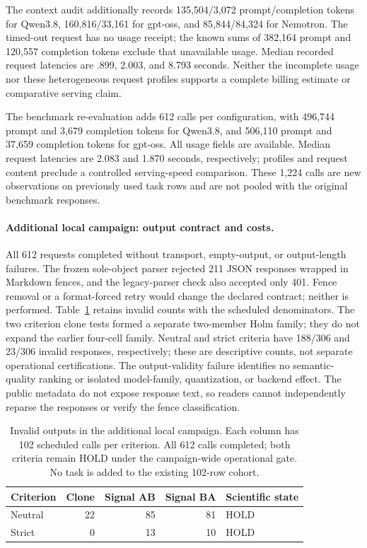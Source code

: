 \documentclass[10pt]{article}
\begin{document}
The context audit additionally records 135{,}504/3{,}072 prompt/completion tokens for Qwen3.8, 160{,}816/33{,}161 for gpt-oss, and 85{,}844/84{,}324 for Nemotron. The timed-out request has no usage receipt; the known sums of 382{,}164 prompt and 120{,}557 completion tokens exclude that unavailable usage. Median recorded request latencies are .899, 2.003, and 8.793 seconds. Neither the incomplete usage nor these heterogeneous request profiles supports a complete billing estimate or comparative serving claim.


The benchmark re-evaluation adds 612 calls per configuration, with 496{,}744 prompt and 3{,}679 completion tokens for Qwen3.8, and 506{,}110 prompt and 37{,}659 completion tokens for gpt-oss. All usage fields are available. Median request latencies are 2.083 and 1.870 seconds, respectively; profiles and request content preclude a controlled serving-speed comparison. These 1,224 calls are new observations on previously used task rows and are not pooled with the original benchmark responses.

\paragraph{Additional local campaign: output contract and costs.}
All 612 requests completed without transport, empty-output, or output-length failures. The frozen sole-object parser rejected 211 JSON responses wrapped in Markdown fences, and the legacy-parser check also accepted only 401. Fence removal or a format-forced retry would change the declared contract; neither is performed. Table~\ref{tab:local-output-hold} retains invalid counts with the scheduled denominators. The two criterion clone tests formed a separate two-member Holm family; they do not expand the earlier four-cell family. Neutral and strict criteria have 188/306 and 23/306 invalid responses, respectively; these are descriptive counts, not separate operational certifications. The output-validity failure identifies no semantic-quality ranking or isolated model-family, quantization, or backend effect. The public metadata do not expose response text, so readers cannot independently reparse the responses or verify the fence classification.

\begin{table}[t]
\centering\small
\caption{Invalid outputs in the additional local campaign. Each column has 102 scheduled calls per criterion. All 612 calls completed; both criteria remain HOLD under the campaign-wide operational gate. No task is added to the existing 102-row cohort.}
\label{tab:local-output-hold}
\begin{tabular}{lrrrl}
\toprule
Criterion & Clone & Signal AB & Signal BA & Scientific state\\
\midrule
Neutral & 22 & 85 & 81 & HOLD\\
Strict & 0 & 13 & 10 & HOLD\\
\bottomrule
\end{tabular}
\end{table}
\end{document}
